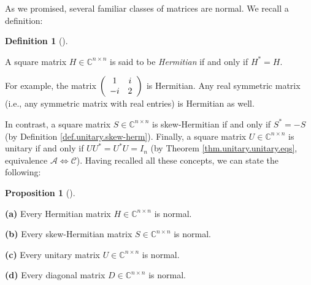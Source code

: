 \documentclass[numbers=enddot,12pt,final,onecolumn,notitlepage]{scrartcl}%
\numberwithin{exer}{subsection}
\theoremstyle{definition}
\newtheorem{prop}[theo]{Proposition}
\newenvironment{proposition}[1][]
{\begin{prop}[#1]\begin{leftbar}}
{\end{leftbar}\end{prop}}
\newtheorem{defi}[theo]{Definition}
\newenvironment{definition}[1][]
{\begin{defi}[#1]\begin{leftbar}}
{\end{leftbar}\end{defi}}
\begin{document}
As we promised, several familiar classes of matrices are normal. We recall a definition:

\begin{definition}
\label{def.schurtri.herm}A square matrix $H\in\mathbb{C}^{n\times n}$ is said
to be \emph{Hermitian} if and only if $H^{\ast}=H$.
\end{definition}

For example, the matrix $\left(
\begin{array}
[c]{cc}%
1 & i\\
-i & 2
\end{array}
\right)  $ is Hermitian. Any real symmetric matrix (i.e., any symmetric matrix
with real entries) is Hermitian as well.

In contrast, a square matrix $S\in\mathbb{C}^{n\times n}$ is skew-Hermitian if
and only if $S^{\ast}=-S$ (by Definition \ref{def.unitary.skew-herm}).
Finally, a square matrix $U\in\mathbb{C}^{n\times n}$ is unitary if and only
if $UU^{\ast}=U^{\ast}U=I_{n}$ (by Theorem \ref{thm.unitary.unitary.eqs},
equivalence $\mathcal{A}\Longleftrightarrow\mathcal{C}$). Having recalled all
these concepts, we can state the following:

\begin{proposition}
\label{prop.schurtri.normal.classes}\textbf{(a)} Every Hermitian matrix
$H\in\mathbb{C}^{n\times n}$ is normal. \medskip

\textbf{(b)} Every skew-Hermitian matrix $S\in\mathbb{C}^{n\times n}$ is
normal. \medskip

\textbf{(c)} Every unitary matrix $U\in\mathbb{C}^{n\times n}$ is normal.
\medskip

\textbf{(d)} Every diagonal matrix $D\in\mathbb{C}^{n\times n}$ is normal.
\end{proposition}
\end{document}
